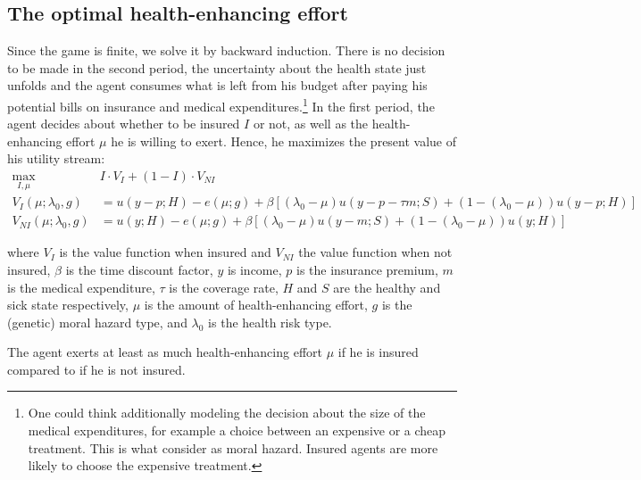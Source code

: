 \subsection{The optimal health-enhancing effort}
Since the game is finite, we solve it by backward induction.
There is no decision to be made in the second period, the uncertainty about the health state just unfolds and the agent consumes what is left from his budget after paying his potential bills on insurance and medical expenditures.\footnote{One could think additionally modeling the decision about the size of the medical expenditures, for example a choice between an expensive or a cheap treatment. This is what \cite{Einav2013} consider as moral hazard. Insured agents are more likely to choose the expensive treatment. %
}
In the first period, the agent decides about whether to be insured $I$ or not, as well as the health-enhancing effort $\mu$ he is willing to exert.
Hence, he  maximizes the present value of his utility stream:
\begin{align*}
	\max_{I,\mu} & I \cdot V_{I} + (1-I) \cdot V_{NI} \\
	V_I(\mu;\lambda_0,g)&=u(y-p;H)-e(\mu;g)+ \beta\left[ (\lambda_0-\mu) u(y-p-\tau m;S)+(1-(\lambda_0-\mu))u(y-p;H)\right] \\
	V_{NI}(\mu;\lambda_0,g)&=u(y;H)-e(\mu;g)+ \beta \left[ (\lambda_0-\mu) u(y-m;S)+(1-(\lambda_0-\mu))u(y;H)\right]
\end{align*}

where $V_{I}$ is the value function when insured and $V_{NI}$ the value function when not insured,
$\beta$ is the time discount factor,
$y$ is income,
$p$ is the insurance premium,
$m$ is the medical expenditure,
$\tau$ is the coverage rate,
$H$ and $S$ are the healthy and sick state respectively,
$\mu$ is the amount of health-enhancing effort,
$g$ is the (genetic) moral hazard type,
and $\lambda_0$ is the health risk type.

\begin{proposition}
	The agent  exerts at least as much health-enhancing effort $\mu$ if he is insured compared to if he is not insured.
\end{proposition}

